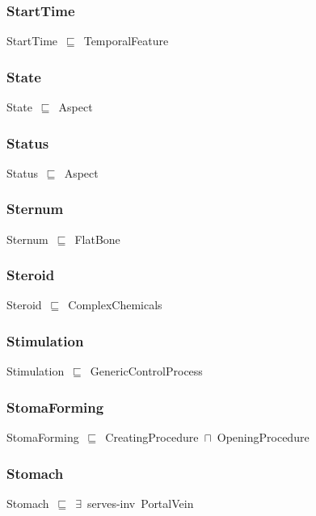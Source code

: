 \documentclass{article}
\begin{document}
\subsubsection*{StartTime}

StartTime~\ensuremath{\sqsubseteq}~TemporalFeature~

\subsubsection*{State}

State~\ensuremath{\sqsubseteq}~Aspect~

\subsubsection*{Status}

Status~\ensuremath{\sqsubseteq}~Aspect~

\subsubsection*{Sternum}

Sternum~\ensuremath{\sqsubseteq}~FlatBone~

\subsubsection*{Steroid}

Steroid~\ensuremath{\sqsubseteq}~ComplexChemicals~

\subsubsection*{Stimulation}

Stimulation~\ensuremath{\sqsubseteq}~GenericControlProcess~

\subsubsection*{StomaForming}

StomaForming~\ensuremath{\sqsubseteq}~CreatingProcedure~\ensuremath{\sqcap}~OpeningProcedure~

\subsubsection*{Stomach}

Stomach~\ensuremath{\sqsubseteq}~\ensuremath{\exists}~serves-inv~PortalVein~
\end{document}
